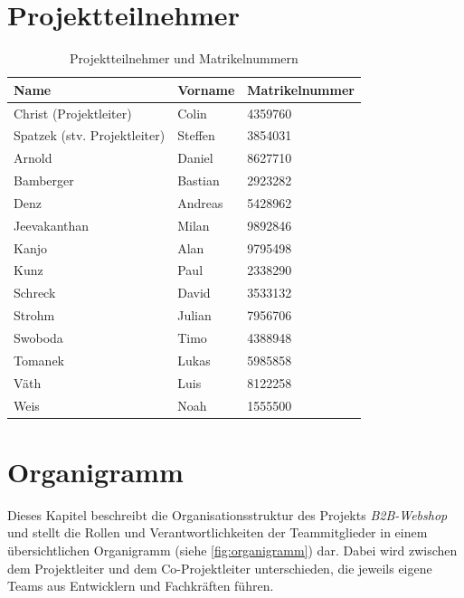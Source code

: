 \documentclass[%
	12pt,
	a4paper,
	oneside,
	parskip=full
]{scrbook}
\begin{document}
\section{Projektteilnehmer}
\begin{table}[ht]
	\centering
	\begin{tabular}{l|l|l}
		\textbf{Name}                & \textbf{Vorname} & \textbf{Matrikelnummer} \\ \hline
		Christ (Projektleiter)       & Colin            & 4359760                 \\
		Spatzek (stv. Projektleiter) & Steffen          & 3854031                 \\ \hline
		Arnold                       & Daniel           & 8627710                 \\
		Bamberger                    & Bastian          & 2923282                 \\
		Denz                         & Andreas          & 5428962                 \\
		Jeevakanthan                 & Milan            & 9892846                 \\
		Kanjo                        & Alan             & 9795498                 \\
		Kunz                         & Paul             & 2338290                 \\
		Schreck                      & David            & 3533132                 \\
		Strohm                       & Julian           & 7956706                 \\
		Swoboda                      & Timo             & 4388948                 \\
		Tomanek                      & Lukas            & 5985858                 \\
		Väth                         & Luis             & 8122258                 \\
		Weis                         & Noah             & 1555500
	\end{tabular}
	\caption{Projektteilnehmer und Matrikelnummern}
	\label{tab:projektteilnehmer}
\end{table}

\section{Organigramm}
Dieses Kapitel beschreibt die Organisationsstruktur des Projekts \textit{B2B-Webshop} und stellt die Rollen und Verantwortlichkeiten der Teammitglieder in einem übersichtlichen Organigramm (siehe \cref{fig:organigramm}) dar.
Dabei wird zwischen dem Projektleiter und dem Co-Projektleiter unterschieden, die jeweils eigene Teams aus Entwicklern und Fachkräften führen.
\end{document}
